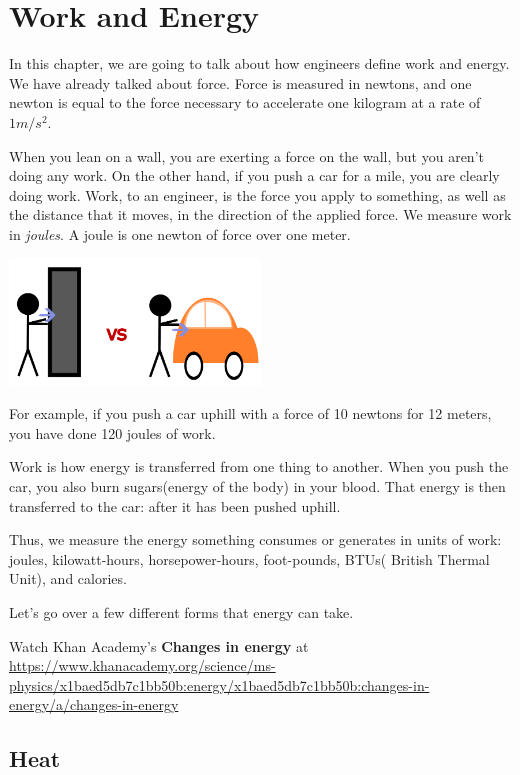 \chapter{Work and Energy}

In this chapter, we are going to talk about how engineers define work
and energy.  We have already talked about force. Force is measured in
newtons, and one newton is equal to the force necessary to accelerate one
kilogram at a rate of $1 m/s^2$.

When you lean on a wall, you are exerting a force on the wall, but you
aren't doing any work. On the other hand, if you push a car for a mile,
you are clearly doing work. Work, to an engineer, is the force you
apply to something, as well as the distance that it moves, in the direction
of the applied force. We measure work in \textit{joules}. A joule is one
newton of force over one meter.

\includegraphics[width=0.5\textwidth]{Work_vs.png}

For example, if you push a car uphill with a force of 10 newtons for 12
meters, you have done 120 joules of work.

Work is how energy is transferred from one thing to another. When you
push the car, you also burn sugars(energy of the body) in your blood. That energy is then
transferred to the car: after it has been pushed uphill.

Thus, we measure the energy something consumes or generates in 
units of work: joules, kilowatt-hours, horsepower-hours, foot-pounds,
BTUs( British Thermal Unit), and calories.

Let's go over a few different forms that energy can take.

Watch Khan Academy's \textbf{Changes in energy} at \url{https://www.khanacademy.org/science/ms-physics/x1baed5db7c1bb50b:energy/x1baed5db7c1bb50b:changes-in-energy/a/changes-in-energy}

\section{Heat}

